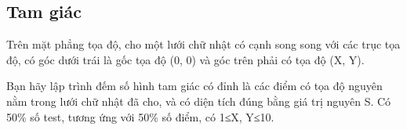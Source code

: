 \subsection{   Tam giác  }

   Trên mặt phẳng tọa độ, cho một lưới chữ nhật có cạnh song song với các trục tọa độ,  có góc dưới   trái là gốc tọa độ (0, 0) và góc trên phải  có tọa độ (X, Y).  

   Bạn hãy lập trình đếm số hình tam giác có đỉnh là các điểm có tọa độ nguyên nằm trong lưới chữ   nhật đã cho, và có diện tích đúng bằng giá trị nguyên S.
Có 50\% số test, tương ứng với 50\% số điểm, có 1≤X, Y≤10.